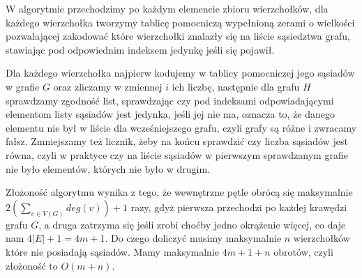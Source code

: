 \documentclass[12pt,a4paper]{article}
\begin{document}
W algorytmie przechodzimy po każdym elemencie zbioru wierzchołków, dla każdego wierzchołka tworzymy tablicę pomocniczą wypełnioną zerami o wielkości pozwalającej zakodować które wierzchołki znalazły się na liście sąsiedztwa grafu, stawiając pod odpowiednim indeksem jedynkę jeśli się pojawił.

Dla każdego wierzchołka najpierw kodujemy w tablicy pomocniczej jego sąsiadów w grafie \( G\) oraz zliczamy w zmiennej \(i\) ich liczbę, następnie dla grafu \(H\) sprawdzamy zgodność list, sprawdzając czy pod indeksami odpowiadającymi elementom listy sąsiadów jest jedynka, jeśli jej nie ma, oznacza to, że danego elementu nie był w liście dla wcześniejszego grafu, czyli grafy są różne i zwracamy fałsz. Zmniejszamy też licznik, żeby na końcu sprawdzić czy liczba sąsiadów jest równa, czyli w praktyce czy na liście sąsiadów w pierwszym sprawdzanym grafie nie było elementów, których nie było w drugim.

Złożoność algorytmu wynika z tego, że wewnętrzne pętle obrócą się maksymalnie  \\\( 2(\sum_{v\in V(G)} deg(v)) + 1\) razy, gdyż pierwsza przechodzi po każdej krawędzi grafu \(G\), a druga zatrzyma się jeśli zrobi choćby jedno okrążenie więcej, co daje nam \( 4|E| + 1 = 4m + 1 \). Do czego doliczyć musimy maksymalnie \(n\) wierzchołków które nie posiadają sąsiadów. Mamy maksymalnie \(4m + 1 + n\) obrotów, czyli złożoność to \( O(m+n) \).
\end{document}
